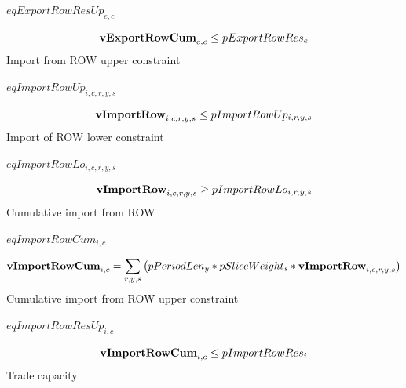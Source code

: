 \documentclass{article}
\begin{document}
$eqExportRowResUp_{e,c}$





\begin{dmath} 
{\bf vExportRowCum}_{e,c}  \le  pExportRowRes_{e}
\end{dmath} 
Import from ROW upper constraint







$eqImportRowUp_{i,c,r,y,s}$





\begin{dmath} 
{\bf vImportRow}_{i,c,r,y,s}  \le  pImportRowUp_{i,r,y,s}
\end{dmath} 
Import of ROW lower constraint







$eqImportRowLo_{i,c,r,y,s}$





\begin{dmath} 
{\bf vImportRow}_{i,c,r,y,s}  \ge  pImportRowLo_{i,r,y,s}
\end{dmath} 
Cumulative import from ROW







$eqImportRowCum_{i,c}$





\begin{dmath} 
{\bf vImportRowCum}_{i,c}  =  \sum_{r,y,s}{\left(pPeriodLen_{y}*pSliceWeight_{s}*{\bf vImportRow}_{i,c,r,y,s}\right)}
\end{dmath} 
Cumulative import from ROW upper constraint







$eqImportRowResUp_{i,c}$





\begin{dmath} 
{\bf vImportRowCum}_{i,c}  \le  pImportRowRes_{i}
\end{dmath} 
Trade capacity
\end{document}

